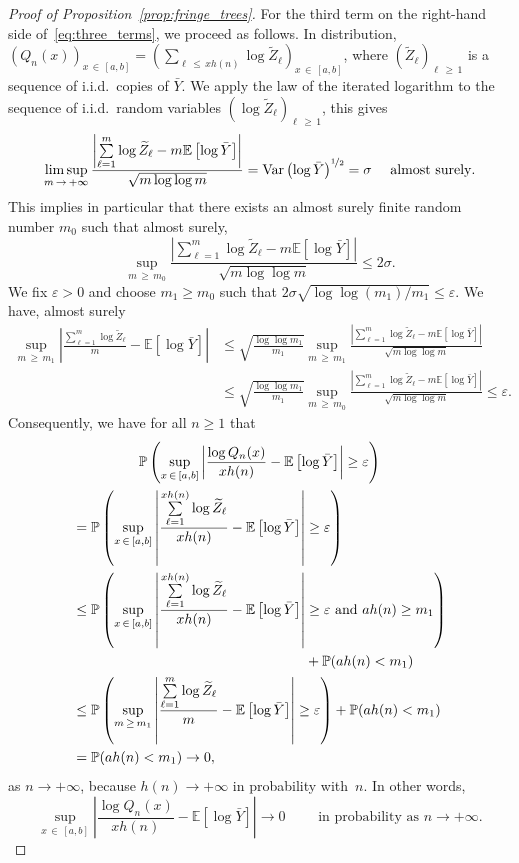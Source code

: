 \documentclass[10pt]{amsart}
\theoremstyle{definition}\newtheorem{defi}[theo]{Definition}\newtheorem{rema}[theo]{Remark}\newtheorem{exam}[theo]{Example}\newtheorem{exem}[theo]{Example}\newtheorem{nota}[theo]{Notation}
\newcommand{\bbP}{\mathbb{P}}
\newcommand{\bbE}{\mathbb{E}}
\newcommand{\Var}{\mathrm{Var}}
\begin{document}
\begin{proof}[Proof of Proposition~\ref{prop:fringe_trees}]
For the third term on the right-hand side of~\eqref{eq:three_terms}, we proceed as follows. In distribution, $(Q_n(x))_{x\,\in\,[a,b]} = (\sum_{\ell\,\leq\,xh(n)}\log \widetilde Z_\ell)_{x\,\in\,[a,b]}$, where $(\widetilde Z_\ell)_{\ell\,\geq\,1}$ is a sequence of i.i.d.\ copies of $\bar Y$. We apply the law of the iterated logarithm to the sequence of i.i.d.\ random variables $(\log \widetilde Z_\ell)_{\ell\,\geq\,1}$, this gives
\[
\limsup_{m\,\to\,+\infty} \frac{\left|\sum\limits_{\ell=1}^m \log \widetilde Z_\ell - m\bbE\left[\log\bar Y\right]\right|}{\sqrt{m\log\log m}} = \Var\left(\log\bar Y\right)^{\nicefrac12}= \sigma\quad\text{ almost surely}.
\]
This implies in particular that there exists an almost surely finite random number $m_0$ such that almost surely,
\[
\sup_{m\,\geq\,m_0} \frac{\left|\sum\limits_{\ell=1}^m \log \widetilde Z_\ell - m\bbE\left[\log\bar Y\right]\right|}{\sqrt{m\log\log m}}
\leq 2\sigma.
\]
We fix $\varepsilon>0$ and choose $m_1\geq m_0$ such that $2\sigma\sqrt{\log\log(m_1)/m_1}\leq \varepsilon$. We have, almost surely
\begin{align*}
\sup_{m\,\geq\,m_1} \left|\frac{\sum\limits_{\ell=1}^m \log \widetilde Z_\ell}m -\bbE\left[\log\bar Y\right]\right| &\leq \sqrt{\frac{\log\log m_1}{m_1}}
\sup_{m\,\geq\,m_1} \frac{\left|\sum\limits_{\ell=1}^m \log \widetilde Z_\ell - m\bbE\left[\log\bar Y\right]\right|}{\sqrt{m\log\log m}}\\
&\leq\sqrt{\frac{\log\log m_1}{m_1}} \sup_{m\,\geq\,m_0} \frac{\left|\sum\limits_{\ell=1}^m \log \widetilde Z_\ell - m\bbE\left[\log\bar Y\right]\right|} {\sqrt{m\log\log m}}\leq \varepsilon.
\end{align*}
Consequently, we have for all $n\geq 1$ that
\begin{multline*}
\bbP\left(\sup_{x\,\in\,[a,b]} \left|\frac{\log Q_n(x)}{xh(n)} - \bbE\left[\log\bar Y\right]\right|\geq \varepsilon\right)\\
\begin{aligned}
&= \bbP\left(\sup_{x\,\in\,[a,b]} \left|\frac{\sum\limits_{\ell=1}^{xh(n)} \log \widetilde Z_\ell}{xh(n)}- \bbE\left[\log\bar Y\right]\right|\geq\varepsilon\right)\\
&\leq \bbP\left(\sup_{x\,\in\,[a,b]} \left|\frac{\sum\limits_{\ell=1}^{xh(n)} \log \widetilde Z_\ell}{xh(n)}- \bbE\left[\log\bar Y\right]\right|\geq\varepsilon\text{ and }ah(n)\geq m_1\right)\\
&\mkern300mu + \bbP(ah(n)<m_1)\\
&\leq \bbP\left(\sup_{m\,\geq\,m_1} \left|\frac{\sum\limits_{\ell=1}^m \log \widetilde Z_\ell}{m}- \bbE\left[\log\bar Y\right]\right|\geq\varepsilon\right) + \bbP(ah(n)<m_1)\\
&= \bbP(ah(n)<m_1)\to 0,
\end{aligned}
\end{multline*}
as $n\to+\infty$, because $h(n)\to+\infty$ in probability with~$n$. In other words,
\begin{equation}\label{eq:2nd}
\sup_{x\,\in\,[a,b]} \left|\frac{\log Q_n(x)}{xh(n)}-\bbE\left[\log \bar Y\right]\right|
\to 0\qquad\text{ in probability as }n\to+\infty.
\end{equation}


\end{proof}
\end{document}
